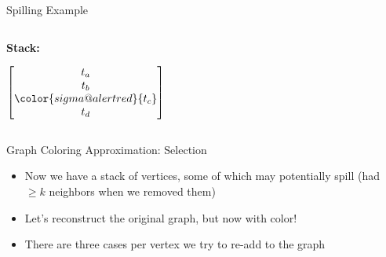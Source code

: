 \documentclass[aspectratio=169]{beamer}
\begin{document}
\begin{frame}{Spilling Example}
    \begin{columns}
        \begin{column}{1cm}
            \textbf{Stack:}
            \vspace{0cm}
            
            $\begin{bmatrix}
                t_a \\ t_b \\ \color{sigma@alertred}{t_c} \\ t_d
            \end{bmatrix}$
        \end{column}
        \begin{column}{8cm}
        \end{column}
    \end{columns}
\end{frame}

\begin{frame}{Graph Coloring Approximation: Selection}
    \begin{itemize}
        \item Now we have a stack of vertices, some of which may potentially spill (had $\ge k$ neighbors when we removed them)
        \item Let's reconstruct the original graph, but now with color!
        \item There are three cases per vertex we try to re-add to the graph
    \end{itemize}
\end{frame}
\end{document}
